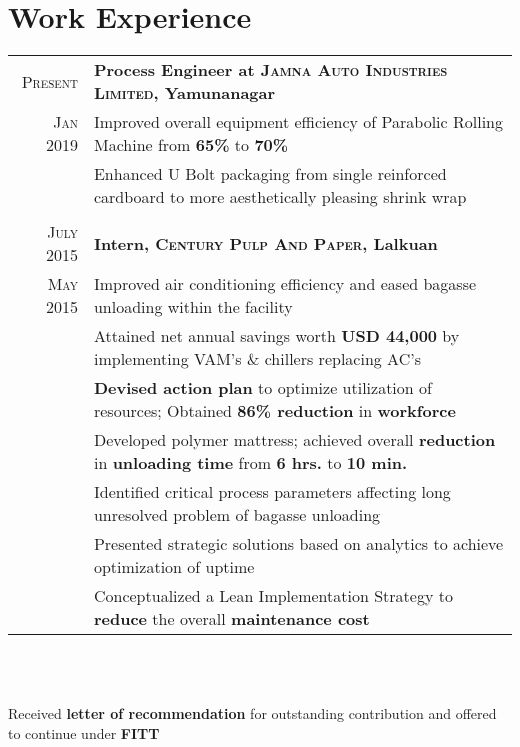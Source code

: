 \documentclass[a4paper,10pt]{article}
\begin{document}
\section{Work Experience}
\begin{tabular}{r|p{18cm}}

\textsc{Present} & \textbf{Process Engineer at \textsc{Jamna Auto Industries Limited}, Yamunanagar} \\
 \textsc{Jan 2019} & Improved overall equipment efficiency of Parabolic Rolling Machine from \textbf{65\%} to \textbf{70\%}\\
 & Enhanced U Bolt packaging from single reinforced cardboard to more aesthetically pleasing shrink wrap\\
 \multicolumn{2}{c}{}\\

 \textsc{July 2015} & \textbf{Intern, \textsc{Century Pulp And Paper}, Lalkuan} \\
 \textsc{May 2015} & Improved air conditioning efficiency and eased bagasse unloading within the facility\\
& Attained net annual savings worth \textbf{USD 44,000} by implementing VAM’s \& chillers replacing AC’s\\
& \textbf{Devised action plan} to optimize utilization of resources; Obtained \textbf{86\% reduction} in \textbf{workforce}\\
& Developed polymer mattress; achieved overall \textbf{reduction} in \textbf{unloading time} from \textbf{6 hrs.} to \textbf{10 min.}\\
& Identified critical process parameters affecting long unresolved problem of bagasse unloading\\
& Presented strategic solutions based on analytics to achieve optimization of uptime\\
& Conceptualized a Lean Implementation Strategy to \textbf{reduce} the overall \textbf{maintenance cost}\\
\end{tabular}\\\\
\centerline{Received \textbf{letter of recommendation} for outstanding contribution and offered to continue under \textbf{FITT}}

\end{document}

